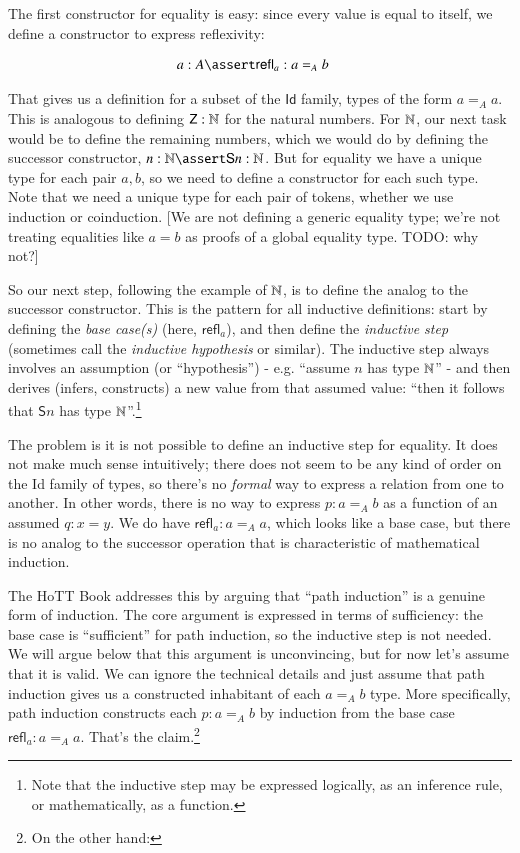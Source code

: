 The first constructor for equality is easy: since every value is equal
to itself, we define a constructor to express reflexivity:

\begin{align}
  & a:A\linfer\textsf{refl}_a: a=_Ab
\end{align}

That gives us a definition for a subset of the \(\textsf{Id}\) family,
types of the form \(a=_A a\). This is analogous to defining
\(\textsf{Z}: \mathbb{N}\) for the natural numbers. For \(\mathbb{N}\), our next
task would be to define the remaining numbers, which we would do by
defining the successor constructor, \(n:\Nat\linfer \textsf{S}n:\Nat\).
But for equality we have a unique type for each pair \(a,b\), so we
need to define a constructor for each such type. Note that we need a unique
type for each pair of tokens, whether we use induction or coinduction.
[We are not defining a generic equality type; we're not treating
  equalities like \(a=b\) as proofs of a global equality type. TODO:
  why not?]

So our next step, following the example of \(\mathbb{N}\), is to define the
analog to the successor constructor. This is the pattern for all
inductive definitions: start by defining the \textit{base case(s)}
(here, \(\textsf{refl}_a\)), and then define the \textit{inductive
  step} (sometimes call the \textit{inductive hypothesis} or similar).
The inductive step always involves an assumption (or ``hypothesis'') -
e.g. ``assume \(n\) has type \(\mathbb{N}\)'' - and then derives (infers,
constructs) a new value from that assumed value: ``then it follows
that \(\textsf{S}n\) has type \(\mathbb{N}\)''.\footnote{Note that the
inductive step may be expressed logically, as an inference rule, or
mathematically, as a function.}

The problem is it is not possible to define an inductive step for
equality. It does not make much sense intuitively; there does not seem
to be any kind of order on the \textsf{Id} family of types, so there's
no \textit{formal} way to express a relation from one to another. In
other words, there is no way to express \(p:a=_A b\) as a function of
an assumed \(q:x=y\). We do have \(\textsf{refl}_a:a=_A a\), which
looks like a base case, but there is no analog to the successor
operation that is characteristic of mathematical induction.

The HoTT Book addresses this by arguing that ``path induction'' is a
genuine form of induction. The core argument is expressed in terms of
sufficiency: the base case is ``sufficient'' for path induction, so
the inductive step is not needed. We will argue below that this
argument is unconvincing, but for now let's assume that it is valid.
We can ignore the technical details and just assume that path
induction gives us a constructed inhabitant of each \(a=_A b\) type.
More specifically, path induction constructs each \(p:a=_A b\) by
induction from the base case \(\textsf{refl}_a:a=_A a\). That's the
claim.\footnote{On the other hand: }

